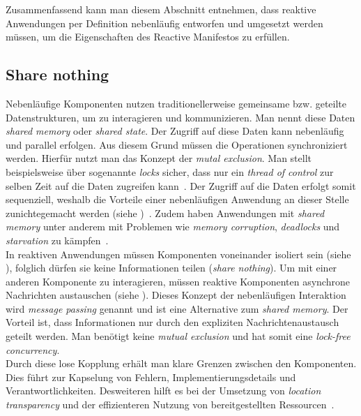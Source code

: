 Zusammenfassend kann man diesem Abschnitt entnehmen, dass reaktive Anwendungen per Definition nebenläufig entworfen und umgesetzt werden müssen, um die Eigenschaften des Reactive Manifestos zu erfüllen.

\pagebreak

\subsection{Share nothing}\label{subsec:sharenothing}
Nebenläufige Komponenten nutzen traditionellerweise gemeinsame bzw. geteilte Datenstrukturen, um zu interagieren und kommunizieren. Man nennt diese Daten \textit{shared memory} oder \textit{shared state}. Der Zugriff auf diese Daten kann nebenläufig und parallel erfolgen. Aus diesem Grund müssen die Operationen synchroniziert werden. Hierfür nutzt man das Konzept der \textit{mutal exclusion}. Man stellt beispielsweise über sogenannte \textit{locks} sicher, dass nur ein \textit{thread of control} zur selben Zeit auf die Daten zugreifen kann~\cite[S.~10]{butcher_seven_2014}. Der Zugriff auf die Daten erfolgt somit sequenziell, weshalb die Vorteile einer nebenläufigen Anwendung an dieser Stelle zunichtegemacht werden (siehe )~\cite[S.~45]{kuhn_reactive_2015}. Zudem haben Anwendungen mit \textit{shared memory} unter anderem mit Problemen wie \textit{memory corruption}, \textit{deadlocks} und \textit{starvation} zu kämpfen~\cite[S.~117]{vernon_reactive_2016}.\\
In reaktiven Anwendungen müssen Komponenten voneinander isoliert sein (siehe ), folglich dürfen sie keine Informationen teilen (\textit{share nothing}). Um mit einer anderen Komponente zu interagieren, müssen reaktive Komponenten asynchrone Nachrichten austauschen (siehe ). Dieses Konzept der nebenläufigen Interaktion wird \textit{message passing} genannt und ist eine Alternative zum \textit{shared memory}. Der Vorteil ist, dass Informationen nur durch den expliziten Nachrichtenaustausch geteilt werden. Man benötigt keine \textit{mutual exclusion} und hat somit eine \textit{lock-free concurrency}.\\
Durch diese lose Kopplung erhält man klare Grenzen zwischen den Komponenten. Dies führt zur Kapselung von Fehlern, Implementierungsdetails und Verantwortlichkeiten. Desweiteren hilft es bei der Umsetzung von \textit{location transparency} und der effizienteren Nutzung von bereitgestellten Ressourcen~\cite[S.~45]{kuhn_reactive_2015}.

